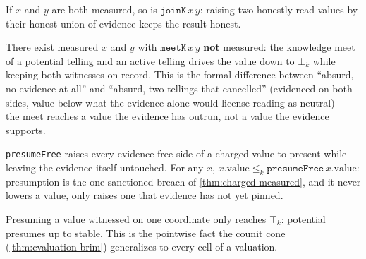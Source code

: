 \begin{theorem}\label{thm:charged-joink-measured}\leanok{}
If \(x\) and \(y\) are both measured, so is \(\texttt{joinK}\,x\,y\): raising
two honestly-read values by their honest union of evidence keeps the result
honest.
\end{theorem}

\begin{theorem}\label{thm:charged-meetk-not-measured}\leanok{}
There exist measured \(x\) and \(y\) with \(\texttt{meetK}\,x\,y\)
\textbf{not} measured: the knowledge meet of a potential telling and an
active telling drives the value down to \(\bot_k\) while keeping both
witnesses on record. This is the formal difference between ``absurd, no
evidence at all'' and
``absurd, two tellings that cancelled'' (evidenced on both sides, value below
what the evidence alone would license reading as neutral) --- the meet
reaches a value the evidence has outrun, not a value the evidence supports.
\end{theorem}

\begin{theorem}\label{thm:charged-presumefree-ge}\leanok{}
\texttt{presumeFree} raises every evidence-free side of a charged value to
present while leaving the evidence itself untouched. For any \(x\),
\(x.\mathrm{value} \le_k \texttt{presumeFree}\,x.\mathrm{value}\): presumption
is the one sanctioned breach of \cref{thm:charged-measured}, and it never
lowers a value, only raises one that evidence has not yet pinned.
\end{theorem}

\begin{theorem}\label{thm:charged-presumefree-articulate}\leanok{}
Presuming a value witnessed on one coordinate only reaches \(\top_k\):
potential presumes up to stable. This is the pointwise fact the
counit cone (\cref{thm:cvaluation-brim}) generalizes to every cell of a
valuation.
\end{theorem}

